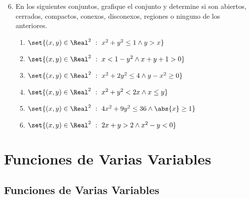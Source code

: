 \begin{frame}
  \begin{enumerate}
  \setcounter{enumi}{5}
  \item En los siguientes conjuntos, grafique el conjunto y determine si son abiertos, cerrados, compactos, conexos, disconexos, regiones o ninguno de los anteriores.
    \vspace{6mm}
    \begin{enumerate}
      \item $\set{(x,y)\in\Real^2\ :\ x^2+y^2 \leq 1\wedge y>x}$
      \vspace{2mm}
      \item $\set{(x,y)\in\Real^2\ :\ x<1-y^2 \wedge x+y+1> 0}$
      \vspace{2mm}
      \item $\set{(x,y)\in\Real^2\ :\ x^2+2y^2\leq 4 \wedge y-x^2\geq 0}$
      \vspace{2mm}
      \item $\set{(x,y)\in\Real^2\ :\ x^2+y^2<2x\wedge x\leq y}$
      \vspace{2mm}
      \item $\set{(x,y)\in\Real^2\ :\ 4x^2+9y^2\leq 36\wedge \abs{x}\geq 1}$
      \vspace{2mm}
      \item $\set{(x,y)\in\Real^2\ :\ 2x+y>2\wedge x^2-y<0}$
    \end{enumerate}
  \end{enumerate}
\end{frame}


\section{Funciones de Varias Variables}
\begin{frame}
\sectionpage
\end{frame}

\begin{frame}
\tableofcontents[currentsection]
\end{frame}

\subsection{Funciones de Varias Variables}
\begin{frame}
\subsectionpage
\end{frame}


